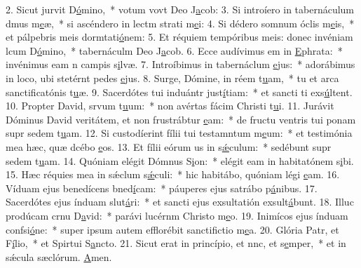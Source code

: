 2. Sicut jurvit D\uline{ó}mino,~* votum vovt Deo J\uline{a}cob:
3. Si introíero in tabernáculum dmus m\uline{e}æ,~* si ascéndero in lectm strati m\uline{e}i:
4. Si dédero somnum óclis m\uline{e}is,~* et pálpebris meis dormtati\uline{ó}nem:
5. Et réquiem tempóribus meis: donec invéniam lcum D\uline{ó}mino,~* tabernáculm Deo J\uline{a}cob.
6. Ecce audívimus em in \uline{E}phrata:~* invénimus eam n campis s\uline{i}lvæ.
7. Introíbimus in tabernáclum \uline{e}jus:~* adorábimus in loco, ubi stetérnt pedes \uline{e}jus.
8. Surge, Dómine, in réem t\uline{u}am,~* tu et arca sanctificatónis t\uline{u}æ.
9. Sacerdótes tui induántr just\uline{í}tiam:~* et sancti ti exs\uline{ú}ltent.
10. Propter David, srvum t\uline{u}um:~* non avértas fácim Christi t\uline{u}i.
11. Jurávit Dóminus David veritátem, et non frustrábtur \uline{e}am:~* de fructu ventris tui ponam supr sedem t\uline{u}am.
12. Si custodíerint fílii tui testamntum m\uline{e}um:~* et testimónia mea hæc, quæ dcébo \uline{e}os.
13. Et fílii eórum us in s\uline{ǽ}culum:~* sedébunt supr sedem t\uline{u}am.
14. Quóniam elégit Dómnus S\uline{i}on:~* elégit eam in habitatónem s\uline{i}bi.
15. Hæc réquies mea in sǽclum s\uline{ǽ}culi:~* hic habitábo, quóniam légi \uline{e}am.
16. Víduam ejus benedícens bned\uline{í}cam:~* páuperes ejus satrábo p\uline{á}nibus.
17. Sacerdótes ejus índuam slut\uline{á}ri:~* et sancti ejus exsultatión exsult\uline{á}bunt.
18. Illuc prodúcam crnu D\uline{a}vid:~* parávi lucérnm Christo m\uline{e}o.
19. Inimícos ejus índuam confsi\uline{ó}ne:~* super ipsum autem efflorébit sanctifictio m\uline{e}a.
20. Glória Patr, et F\uline{í}lio,~* et Spirtui S\uline{a}ncto.
21. Sicut erat in princípio, et nnc, et s\uline{e}mper,~* et in sǽcula sæclórum. \uline{A}men.

